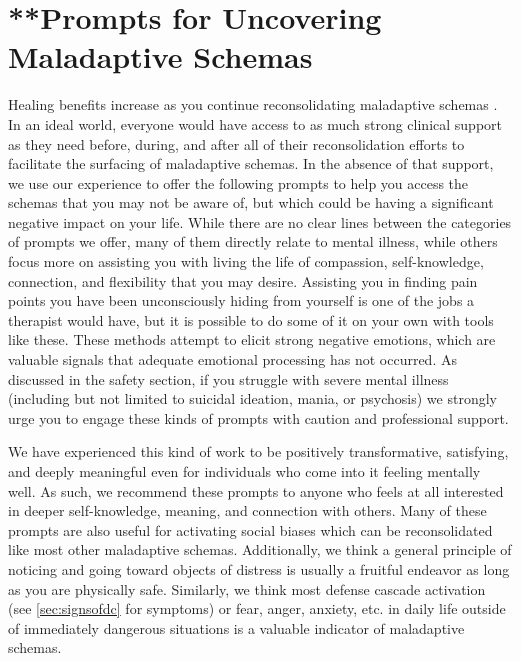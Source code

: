 \documentclass[12pt,letterpaper]{book}
\begin{document}
\section{**Prompts for Uncovering Maladaptive Schemas}
\label{uncovering}
Healing benefits increase as you continue reconsolidating maladaptive schemas \cite{eckerUnlocking}. In an ideal world, everyone would have access to as much strong clinical support as they need before, during, and after all of their reconsolidation efforts to facilitate the surfacing of maladaptive schemas. In the absence of that support, we use our experience to offer the following prompts to help you access the schemas that you may not be aware of, but which could be having a significant negative impact on your life. While there are no clear lines between the categories of prompts we offer, many of them directly relate to mental illness, while others focus more on assisting you with living the life of compassion, self-knowledge, connection, and flexibility that you may desire. Assisting you in finding pain points you have been unconsciously hiding from yourself is one of the jobs a therapist would have, but it is possible to do some of it on your own with tools like these. These methods attempt to elicit strong negative emotions, which are valuable signals that adequate emotional processing has not occurred. As discussed in the safety section, if you struggle with severe mental illness (including but not limited to suicidal ideation, mania, or psychosis) we strongly urge you to engage these kinds of prompts with caution and professional support.

We have experienced this kind of work to be positively transformative, satisfying, and deeply meaningful even for individuals who come into it feeling mentally well. As such, we recommend these prompts to anyone who feels at all interested in deeper self-knowledge, meaning, and connection with others. Many of these prompts are also useful for activating social biases which can be reconsolidated like most other maladaptive schemas. Additionally, we think a general principle of noticing and going toward objects of distress is usually a fruitful endeavor as long as you are physically safe. Similarly, we think most defense cascade activation (see \ref{sec:signsofdc} for symptoms) or fear, anger, anxiety, etc. in daily life outside of immediately dangerous situations is a valuable indicator of maladaptive schemas.
\end{document}
